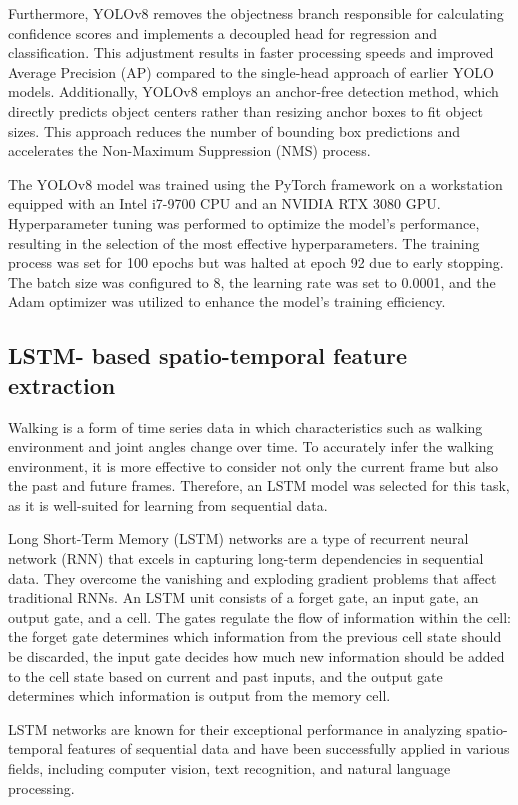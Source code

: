 \documentclass[journal,article,submit,pdftex,moreauthors]{Definitions/mdpi}
\begin{document}
Furthermore, YOLOv8 removes the objectness branch responsible for calculating confidence scores and implements a decoupled head for regression and classification. This adjustment results in faster processing speeds and improved Average Precision (AP) compared to the single-head approach of earlier YOLO models. Additionally, YOLOv8 employs an anchor-free detection method, which directly predicts object centers rather than resizing anchor boxes to fit object sizes. This approach reduces the number of bounding box predictions and accelerates the Non-Maximum Suppression (NMS) process.

The YOLOv8 model was trained using the PyTorch framework on a workstation equipped with an Intel i7-9700 CPU and an NVIDIA RTX 3080 GPU. Hyperparameter tuning was performed to optimize the model's performance, resulting in the selection of the most effective hyperparameters. The training process was set for 100 epochs but was halted at epoch 92 due to early stopping. The batch size was configured to 8, the learning rate was set to 0.0001, and the Adam optimizer was utilized to enhance the model’s training efficiency.
\subsection{LSTM- based spatio-temporal feature extraction}
Walking is a form of time series data in which characteristics such as walking environment and joint angles change over time. To accurately infer the walking environment, it is more effective to consider not only the current frame but also the past and future frames. Therefore, an LSTM model was selected for this task, as it is well-suited for learning from sequential data.

Long Short-Term Memory (LSTM) networks are a type of recurrent neural network (RNN) that excels in capturing long-term dependencies in sequential data. They overcome the vanishing and exploding gradient problems that affect traditional RNNs. An LSTM unit consists of a forget gate, an input gate, an output gate, and a cell. The gates regulate the flow of information within the cell: the forget gate determines which information from the previous cell state should be discarded, the input gate decides how much new information should be added to the cell state based on current and past inputs, and the output gate determines which information is output from the memory cell.

LSTM networks are known for their exceptional performance in analyzing spatio-temporal features of sequential data and have been successfully applied in various fields, including computer vision, text recognition, and natural language processing.
\end{document}
